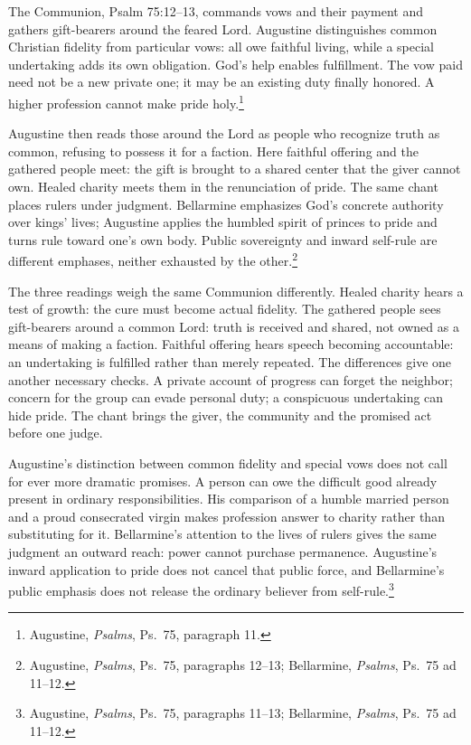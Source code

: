 The Communion, Psalm 75:12--13, commands vows and their payment and gathers gift-bearers around the feared Lord. Augustine distinguishes common Christian fidelity from particular vows: all owe faithful living, while a special undertaking adds its own obligation. God's help enables fulfillment. The vow paid need not be a new private one; it may be an existing duty finally honored. A higher profession cannot make pride holy.\footnote{Augustine, \textit{Psalms}, Ps.~75, paragraph 11.}

Augustine then reads those around the Lord as people who recognize truth as common, refusing to possess it for a faction. Here faithful offering and the gathered people meet: the gift is brought to a shared center that the giver cannot own. Healed charity meets them in the renunciation of pride. The same chant places rulers under judgment. Bellarmine emphasizes God's concrete authority over kings' lives; Augustine applies the humbled spirit of princes to pride and turns rule toward one's own body. Public sovereignty and inward self-rule are different emphases, neither exhausted by the other.\footnote{Augustine, \textit{Psalms}, Ps.~75, paragraphs 12--13; Bellarmine, \textit{Psalms}, Ps.~75 ad 11--12.}

The three readings weigh the same Communion differently. Healed charity hears a test of growth: the cure must become actual fidelity. The gathered people sees gift-bearers around a common Lord: truth is received and shared, not owned as a means of making a faction. Faithful offering hears speech becoming accountable: an undertaking is fulfilled rather than merely repeated. The differences give one another necessary checks. A private account of progress can forget the neighbor; concern for the group can evade personal duty; a conspicuous undertaking can hide pride. The chant brings the giver, the community and the promised act before one judge.

Augustine's distinction between common fidelity and special vows does not call for ever more dramatic promises. A person can owe the difficult good already present in ordinary responsibilities. His comparison of a humble married person and a proud consecrated virgin makes profession answer to charity rather than substituting for it. Bellarmine's attention to the lives of rulers gives the same judgment an outward reach: power cannot purchase permanence. Augustine's inward application to pride does not cancel that public force, and Bellarmine's public emphasis does not release the ordinary believer from self-rule.\footnote{Augustine, \textit{Psalms}, Ps.~75, paragraphs 11--13; Bellarmine, \textit{Psalms}, Ps.~75 ad 11--12.}

